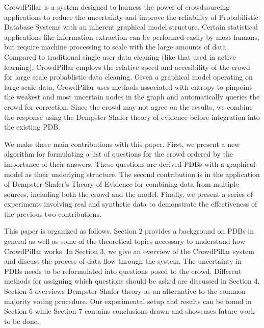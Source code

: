 CrowdPillar is a system designed to harness the power of crowdsourcing applications to reduce the uncertainty and improve the reliability of Probabilistic Database Systems with an inherent graphical model structure.  Certain statistical applications like information extraction can be performed easily by most humans, but require machine processing to scale with the large amounts of data.  Compared to traditional single user data cleaning (like that used in active learning), CrowdPillar employs the relative speed and accesibility of the crowd for large scale probablistic data cleaning.  Given a graphical model operating on large scale data, CrowdPillar uses methods associated with entropy to pinpoint the weakest and most uncertain nodes in the graph and automatically queries the crowd for correction.  Since the crowd may not agree on the results, we combine the response using the Dempster-Shafer theory of evidence before integration into the existing PDB.

We make three main contributions with this paper.  First, we present a new algorithm for formulating a list of questions for the crowd ordered by the importance of their answers.  These questions are derived PDBs with a graphical model as their underlying structure.  The second contribution is in the application of Dempster-Shafer's Theory of Evidence for combining data from multiple sources, including both the crowd and the model.  Finally, we present a series of experiments involving real and synthetic data to demonstrate the effectiveness of the previous two contributions.

This paper is organized as follows.  Section 2 provides a background on PDBs in general as well as some of the theoretical topics necessary to understand how CrowdPillar works.  In Section 3, we give an overview of the CrowdPillar system and discuss the process of data flow through the system.  The uncertainty in PDBs needs to be reformulated into questions posed to the crowd.  Different methods for assigning which questions should be asked are discussed in Section 4.  Section 5 overviews Dempster-Shafer theory as an alternative to the common majority voting procedure.  Our experimental setup and results can be found in Section 6 while Section 7 contains conclusions drawn and showcases future work to be done.
